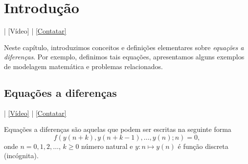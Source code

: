 
\chapter{Introdução}\label{cap_intro}

\begin{flushright}
  [Áudio] | [Vídeo] | \href{https://phkonzen.github.io/notas/contato.html}{[Contatar]}
\end{flushright}

Neste capítulo, introduzimos conceitos e definições elementares sobre \emph{equações a diferenças}. Por exemplo, definimos tais equações, apresentamos alguns exemplos de modelagem matemática e problemas relacionados.

\section{Equações a diferenças}\label{cap_intro_sec_ead}

\begin{flushleft}
  [Áudio] | \href{https://archive.org/details/ead-intro}{[Vídeo]} | \href{https://phkonzen.github.io/notas/contato.html}{[Contatar]}
\end{flushleft}

Equações a diferenças são aquelas que podem ser escritas na seguinte forma
\begin{equation}\label{eq:intro_ead}
  f\left(y(n+k),y(n+k-1),\dotsc,y(n);n\right) = 0,
\end{equation}
onde $n=0, 1, 2, \ldots$, $k\geq 0$ número natural e $y:n\mapsto y(n)$ é função discreta (incógnita).

